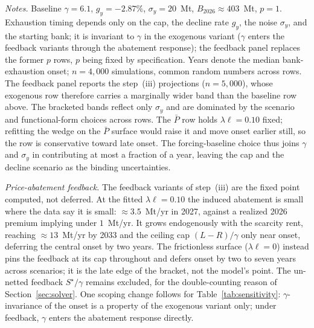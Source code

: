 \documentclass[11pt,letterpaper]{article}
\theoremstyle{plain}
\theoremstyle{definition}
\numberwithin{equation}{section}
\begin{document}
\begin{table}[H]
\smallskip
{\footnotesize\justifying
\textit{Notes.} Baseline $\gamma=6.1$, $g_y=-2.87\%$, $\sigma_y=20$~Mt, $B_{2026}\approx403$~Mt, $p=1$.
Exhaustion timing depends only on the cap, the decline rate $g_y$, the noise $\sigma_y$, and the starting bank; it is invariant to $\gamma$ in the exogenous variant ($\gamma$ enters the feedback variants through the abatement response); the feedback panel replaces the former $p$ rows, $p$ being fixed by specification. Years denote the median bank-exhaustion onset; $n=4{,}000$ simulations, common random numbers across rows. The feedback panel reports the step~(iii) projections ($n=5{,}000$), whose exogenous row therefore carries a marginally wider band than the baseline row above. The bracketed bands reflect only $\sigma_y$ and are dominated by the scenario and functional-form choices across rows. The $\bar P$ row holds $\lambda\ell=0.10$ fixed; refitting the wedge on the $\bar P$ surface would raise it and move onset earlier still, so the row is conservative toward late onset. The forcing-baseline choice thus joins $\gamma$ and $\sigma_y$ in contributing at most a fraction of a year, leaving the cap and the decline scenario as the binding uncertainties. \par}
\end{table}

\emph{Price-abatement feedback.} The feedback variants of step~(iii) are the fixed point computed, not deferred. At the fitted $\lambda\ell=0.10$ the induced abatement is small where the data say it is small: $\approx3.5$~Mt/yr in 2027, against a realized 2026 premium implying under $1$~Mt/yr. It grows endogenously with the scarcity rent, reaching $\approx13$~Mt/yr by 2033 and the ceiling cap $(L-R)/\gamma$ only near onset, deferring the central onset by two years. The frictionless surface ($\lambda\ell=0$) instead pins the feedback at its cap throughout and defers onset by two to seven years across scenarios; it is the late edge of the bracket, not the model's point. The un-netted feedback $S^{\star}/\gamma$ remains excluded, for the double-counting reason of Section~\ref{sec:solver}. One scoping change follows for Table~\ref{tab:sensitivity}: $\gamma$-invariance of the onset is a property of the exogenous variant only; under feedback, $\gamma$ enters the abatement response directly.

\end{document}
